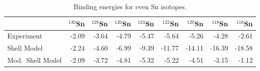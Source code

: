 \begin{table}[htbp]
     \caption{Binding energies for even Sn isotopes.}
     \label{tab:sec1table1}
     \begin{center}
     \begin{tabular}{lrrrrrrrr}
      &$^{130}$Sn &$^{128}$Sn &$^{126}$Sn &$^{124}$Sn &$^{122}$Sn
                              &$^{120}$Sn &$^{118}$Sn &$^{116}$Sn\\\hline
      Experiment       &-2.09&-3.64&-4.79&-5.47& -5.64& -5.26& -4.28& -2.61\\
      Shell Model      &-2.24&-4.60&-6.99&-9.39&-11.77&-14.11&-16.39&-18.58\\
      Mod.\ Shell Model &-2.09&-3.72&-4.81&-5.32& -5.22& -4.51& -3.15& -1.12\\
      \end{tabular}
     \end{center}
\end{table}
























